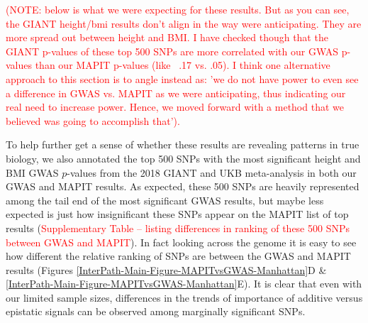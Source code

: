 \documentclass[12pt,a4paper]{article}
\begin{document}
\textcolor{red}{(NOTE: below is what we were expecting for these results. But as you can see, the GIANT height/bmi results don't align in the way were anticipating. They are more spread out between height and BMI. I have checked though that the GIANT p-values of these top 500 SNPs are more correlated with our GWAS p-values than our MAPIT p-values (like ~.17 vs. .05). 
I think one alternative approach to this section is to angle instead as: 'we do not have power to even see a difference in GWAS vs. MAPIT as we were anticipating, thus indicating our real need to increase power. Hence, we moved forward with a method that we believed was going to accomplish that').}

To help further get a sense of whether these results are revealing patterns in true biology, we also annotated the top 500 SNPs with the most significant height and BMI GWAS $p$-values from the 2018 GIANT and UKB meta-analysis \cite{Yengo2018} in both our GWAS and MAPIT results. As expected, these 500 SNPs are heavily represented among the tail end of the most significant GWAS results, but maybe less expected is just how insignificant these SNPs appear on the MAPIT list of top results (\textcolor{red}{Supplementary Table -- listing differences in ranking of these 500 SNPs between GWAS and MAPIT}). In fact looking across the genome it is easy to see how different the relative ranking of SNPs are between the GWAS and MAPIT results (Figures \ref{InterPath-Main-Figure-MAPITvsGWAS-Manhattan}D \& \ref{InterPath-Main-Figure-MAPITvsGWAS-Manhattan}E). It is clear that even with our limited sample sizes, differences in the trends of importance of additive versus epistatic signals can be observed among marginally significant SNPs.  
\end{document}
